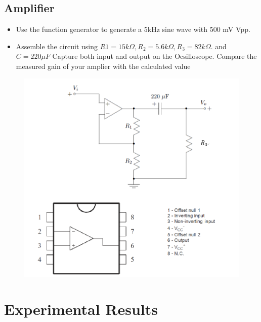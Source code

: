 \documentclass[12pt]{article}
\begin{document}
\subsection{Amplifier}
\begin{itemize}
\item Use the function generator to generate a 5kHz sine wave with 500 mV Vpp.
\item Assemble the circuit using $R1=15k\Omega,R_2=5.6k\Omega,R_3=82k\Omega$. and $C=220\mu F$ Capture both input
and output on the Ocsilloscope. Compare the measured gain of your amplier with the calculated value
\end{itemize}
\begin{figure}[H]
\centering
\includegraphics[scale=0.5]{P11.jpg}
\end{figure}
\section{Experimental Results}
\end{document}
